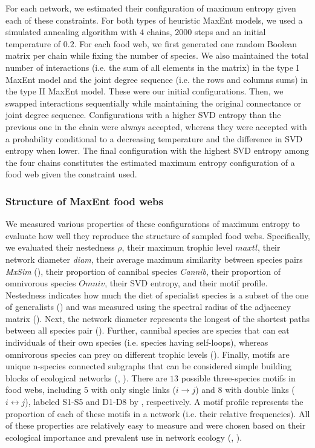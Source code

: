 For each network, we estimated their configuration of maximum entropy given each
of these constraints. For both types of heuristic MaxEnt models, we used a
simulated annealing algorithm with $4$ chains, $2000$ steps and an initial
temperature of $0.2$. For each food web, we first generated one random Boolean
matrix per chain while fixing the number of species. We also maintained the
total number of interactions (i.e. the sum of all elements in the matrix) in the
type I MaxEnt model and the joint degree sequence (i.e. the rows and columns
sums) in the type II MaxEnt model. These were our initial configurations. Then,
we swapped interactions sequentially while maintaining the original connectance
or joint degree sequence. Configurations with a higher SVD entropy than the
previous one in the chain were always accepted, whereas they were accepted with
a probability conditional to a decreasing temperature and the difference in SVD
entropy when lower. The final configuration with the highest SVD entropy among
the four chains constitutes the estimated maximum entropy configuration of a
food web given the constraint used. 

\subsubsection{Structure of MaxEnt food webs}

We measured various properties of these configurations of maximum entropy to
evaluate how well they reproduce the structure of sampled food webs.
Specifically, we evaluated their nestedness $\rho$, their maximum trophic level
$maxtl$, their network diameter \textit{diam}, their average maximum similarity
between species pairs \textit{MxSim} (\cite{Williams2000Simple}), their
proportion of cannibal species \textit{Cannib}, their proportion of omnivorous
species $Omniv$, their SVD entropy, and their motif profile. Nestedness
indicates how much the diet of specialist species is a subset of the one of
generalists (\cite{Delmas2019Analysing}) and was measured using the spectral
radius of the adjacency matrix (\cite{Staniczenko2013Ghost}). Next, the
network diameter represents the longest of the shortest paths between all
species pair (\cite{Albert2002Statistical}). Further, cannibal species are species
that can eat individuals of their own species (i.e. species having self-loops),
whereas omnivorous species can prey on different trophic levels
(\cite{Williams2000Simple}). Finally, motifs are unique n-species connected
subgraphs that can be considered simple building blocks of ecological networks
(\cite{Milo2002Network}, \cite{Stouffer2007Evidence}). There are $13$ possible
three-species motifs in food webs, including $5$ with only single links ($i
\rightarrow j$) and $8$ with double links ($i \leftrightarrow j$), labeled S1-S5
and D1-D8 by \textcite{Stouffer2007Evidence}, respectively. A motif profile represents
the proportion of each of these motifs in a network (i.e. their relative
frequencies). All of these properties are relatively easy to measure and were
chosen based on their ecological importance and prevalent use in network ecology
(\cite{McCann2011Food}, \cite{Delmas2019Analysing}). 

